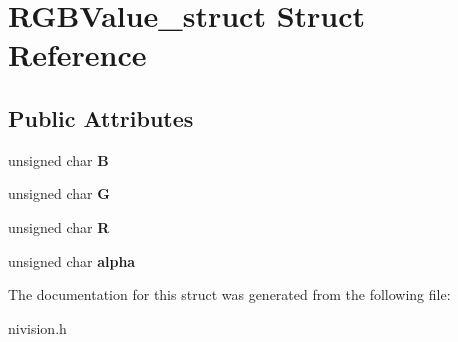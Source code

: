 \hypertarget{structRGBValue__struct}{\section{\-R\-G\-B\-Value\-\_\-struct \-Struct \-Reference}
\label{structRGBValue__struct}
}
\subsection*{\-Public \-Attributes}
\begin{DoxyCompactItemize}
\item 
\hypertarget{structRGBValue__struct_a73c865a0825e7219a8c1ed41dbf677d6}{unsigned char {\bfseries \-B}}\label{structRGBValue__struct_a73c865a0825e7219a8c1ed41dbf677d6}

\item 
\hypertarget{structRGBValue__struct_afe8cb752bc2c0b38bc2bff01e6ae1bbb}{unsigned char {\bfseries \-G}}\label{structRGBValue__struct_afe8cb752bc2c0b38bc2bff01e6ae1bbb}

\item 
\hypertarget{structRGBValue__struct_ab7da47821d67f7ff7dea148bd4a790e4}{unsigned char {\bfseries \-R}}\label{structRGBValue__struct_ab7da47821d67f7ff7dea148bd4a790e4}

\item 
\hypertarget{structRGBValue__struct_a780de0fe393841107283d21630f9e04a}{unsigned char {\bfseries alpha}}\label{structRGBValue__struct_a780de0fe393841107283d21630f9e04a}

\end{DoxyCompactItemize}


\-The documentation for this struct was generated from the following file\-:\begin{DoxyCompactItemize}
\item 
nivision.\-h\end{DoxyCompactItemize}
